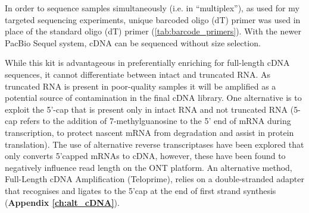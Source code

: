 In order to sequence samples simultaneously (i.e. in “multiplex”), as used for my targeted sequencing experiments, unique barcoded oligo (dT) primer was used in place of the standard oligo (dT) primer (\cref{tab:barcode_primers}). With the newer PacBio Sequel system, cDNA can be sequenced without size selection.

While this kit is advantageous in preferentially enriching for full-length cDNA sequences, it cannot differentiate between intact and truncated RNA. As truncated RNA is present in poor-quality samples it will be amplified as a potential source of contamination in the final cDNA library. One alternative is to exploit the 5’-cap that is present only in intact RNA and not truncated RNA (5-cap refers to the addition of 7-methylguanosine to the 5’ end of mRNA during transcription, to protect nascent mRNA from degradation and assist in protein translation). The use of alternative reverse transcriptases have been explored that only converts 5’capped mRNAs to cDNA, however, these have been found to negatively influence read length on the ONT platform\cite{Cartolano2016}. An alternative method, Full-Length cDNA Amplification (Teloprime)\cite{Cartolano2016}, relies on a double-stranded adapter that recognises and ligates to the 5’cap at the end of first strand synthesis (\textbf{Appendix \ref{ch:alt_cDNA}}).

